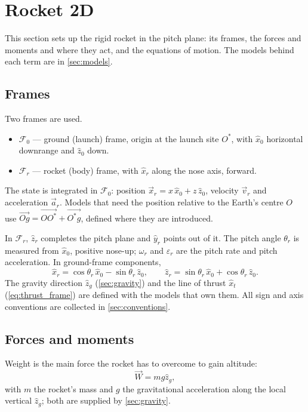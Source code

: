 \section{Rocket 2D}\label{sec:rocket2d}
This section sets up the rigid rocket in the pitch plane: its frames, the forces and moments and
where they act, and the equations of motion. The models behind each term are in
\autoref{sec:models}.

\subsection{Frames}\label{sec:frames}
Two frames are used.
\begin{itemize}
    \item $\mathcal{F}_0$ --- ground (launch) frame, origin at the launch site $O^*$, with
    $\hat{x}_0$ horizontal downrange and $\hat{z}_0$ down.
    \item $\mathcal{F}_r$ --- rocket (body) frame, with $\hat{x}_r$ along the nose axis, forward.
\end{itemize}
The state is integrated in $\mathcal{F}_0$: position $\vec{x}_r=x\,\hat{x}_0+z\,\hat{z}_0$,
velocity $\vec{v}_r$ and acceleration $\vec{a}_r$. Models that need the position relative to the
Earth's centre $O$ use $\vec{Og}=\vec{OO^*}+\vec{O^*g}$, defined where they are introduced.

In $\mathcal{F}_r$, $\hat{z}_r$ completes the pitch plane and $\hat{y}_r$ points out of it. The
pitch angle $\theta_r$ is measured from $\hat{x}_0$, positive nose-up; $\omega_r$ and
$\varepsilon_r$ are the pitch rate and pitch acceleration. In ground-frame components,
\begin{equation}\label{eq:body_axes_in_ground}
    \hat{x}_r = \cos\theta_r\,\hat{x}_0 - \sin\theta_r\,\hat{z}_0, \qquad
    \hat{z}_r = \sin\theta_r\,\hat{x}_0 + \cos\theta_r\,\hat{z}_0.
\end{equation}
The gravity direction $\hat{z}_g$ (\autoref{sec:gravity}) and the line of thrust $\hat{x}_t$
(\autoref{eq:thrust_frame}) are defined with the models that own them. All sign and axis
conventions are collected in \autoref{sec:conventions}.

\subsection{Forces and moments}\label{sec:forces}
Weight is the main force the rocket has to overcome to gain altitude:
\begin{equation}
    \vec{W} = mg\hat{z}_g,
\end{equation}
with $m$ the rocket's mass and $g$ the gravitational acceleration along the local vertical
$\hat{z}_g$; both are supplied by \autoref{sec:gravity}.

